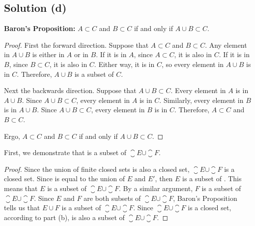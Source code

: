 \documentclass[11pt]{article}
\begin{document}
    \subsection{Solution (d)}
        \textbf{Baron's Proposition:} $A \subset C$ and $B \subset C$ if and only if $A \cup B \subset C$.
        \begin{proof}
            First the forward direction.
            Suppose that $A \subset C$ and $B \subset C$.
            Any element in $A \cup B$ is either in $A$ or in $B$.
            If it is in $A$, since $A \subset C$, it is also in $C$.
            If it is in $B$, since $B \subset C$, it is also in $C$.
            Either way, it is in $C$, so every element in $A \cup B$ is in $C$.
            Therefore, $A \cup B$ is a subset of $C$.

            Next the backwards direction.
            Suppose that $A \cup B \subset C$.
            Every element in $A$ is in $A \cup B$.
            Since $A \cup B \subset C$, every element in $A$ is in $C$.
            Similarly, every element in $B$ is in $A \cup B$.
            Since $A \cup B \subset C$, every element in $B$ is in $C$.
            Therefore, $A \subset C$ and $B \subset C$.

            Ergo, $A \subset C$ and $B \subset C$ if and only if $A \cup B \subset C$.
        \end{proof}

        First, we demonstrate that  is a subset of $\closure{E} \cup \closure{F}$.
        \begin{proof}
            Since the union of finite closed sets is also a closed set, $\closure{E} \cup \closure{F}$ is a closed set.
            Since  is equal to the union of $E$ and $E'$, then $E$ is a subset of .
            This means that $E$ is a subset of $\closure{E} \cup \closure{F}$.
            By a similar argument, $F$ is a subset of $\closure{E} \cup \closure{F}$.
            Since $E$ and $F$ are both subsets of $\closure{E} \cup \closure{F}$, Baron's Proposition tells us that $E \cup F$ is a subset of $\closure{E} \cup \closure{F}$.
            Since $\closure{E} \cup \closure{F}$ is a closed set, according to part (b),  is also a subset of $\closure{E} \cup \closure{F}$.
        \end{proof}
\end{document}

